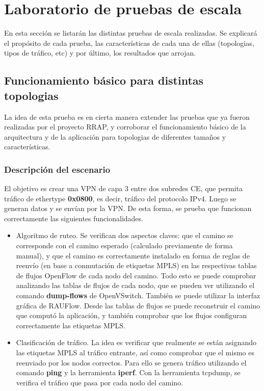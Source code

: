 \chapter{Laboratorio de pruebas de escala}
En esta sección se listarán las distintas pruebas de escala realizadas. Se explicará el propósito de cada prueba, las características de cada una de ellas (topologias, tipos de tráfico, etc) y por último, los resultados que arrojan.

\section{Funcionamiento básico para distintas topologias}
La idea de esta prueba es en cierta manera extender las pruebas que ya fueron realizadas por el proyecto RRAP, y corroborar el funcionamiento básico de la arquitectura y de la aplicación para topologias de diferentes tamaños y características.
\subsection{Descripción del escenario}
El objetivo es crear una VPN de capa 3 entre dos subredes CE, que permita tráfico de ethertype \textbf{0x0800}, es decir, tráfico del protocolo IPv4. Luego se generan datos y se envían por la VPN. De esta forma, se prueba que funcionan correctamente las siguientes funcionalidades.

\begin{itemize}
	\item Algoritmo de ruteo. Se verifican dos aspectos claves: que el camino se corresponde con el camino esperado (calculado previamente de forma manual), y que el camino es correctamente instalado en forma de reglas de reenvío (en base a conmutación de etiquetas MPLS) en las respectivas tablas de flujos OpenFlow de cada nodo del camino. Todo esto se puede comprobar analizando las tablas de flujos de cada nodo, que se pueden ver utilizando el comando \textbf{dump-flows} de OpenVSwitch. También se puede utilizar la interfaz gráfica de RAUFlow. Desde las tablas de flujos se puede reconstruir el camino que computó la aplicación, y también comprobar que los flujos configuran correctamente las etiquetas MPLS.
	
	\item Clasificación de tráfico. La idea es verificar que realmente se están asignando las etiquetas MPLS al tráfico entrante, así como comprobar que el mismo es reenviado por los nodos correctos. Para ello se genera tráfico utilizando el comando \textbf{ping} y la herramienta \textbf{iperf}. Con la herramienta tcpdump, se verifica el tráfico que pasa por cada nodo del camino.
\end{itemize}

